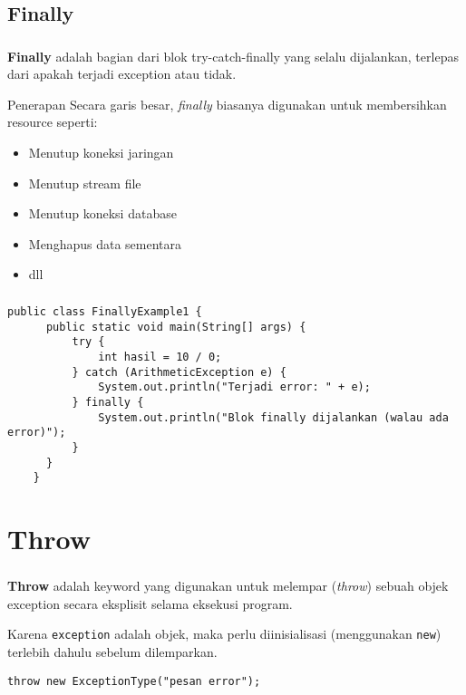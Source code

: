 \documentclass{../praktikum-ppt}
\begin{document}
    \subsection{Finally}
    \begin{frame}
      \frametitle{\insertsection}
      \framesubtitle{\insertsubsection}
      \begin{definisi}
        \textbf{Finally} adalah bagian dari blok try-catch-finally yang selalu dijalankan, terlepas dari apakah terjadi exception atau tidak.        
      \end{definisi}
      \begin{block}{Penerapan}
        Secara garis besar, \textit{finally} biasanya digunakan untuk membersihkan resource seperti:
        \begin{itemize}
          \item Menutup koneksi jaringan
          \item Menutup stream file
          \item Menutup koneksi database
          \item Menghapus data sementara
          \item dll
        \end{itemize}
      \end{block}
    \end{frame}

    \begin{frame}[fragile]
      \frametitle{\insertsection}
      \framesubtitle{\insertsubsection}
      \begin{lstlisting}[caption={\textit{Try-Catch-Finally} pada Java}]
    public class FinallyExample1 {
      public static void main(String[] args) {
          try {
              int hasil = 10 / 0;
          } catch (ArithmeticException e) {
              System.out.println("Terjadi error: " + e);
          } finally {
              System.out.println("Blok finally dijalankan (walau ada error)");
          }
      }
    }
      \end{lstlisting}
    \end{frame}

    \section{Throw}
    \begin{frame}[fragile]
      \frametitle{\insertsection}
      \begin{definisi}
        \textbf{Throw} adalah keyword yang digunakan untuk melempar (\textit{throw}) sebuah objek exception secara eksplisit selama eksekusi program.
      \end{definisi}
      Karena \texttt{exception} adalah objek, maka perlu diinisialisasi (menggunakan \texttt{new}) terlebih dahulu sebelum dilemparkan.
      \begin{lstlisting}[caption={Syntax \textit{Throw}}]
        throw new ExceptionType("pesan error");
      \end{lstlisting}
    \end{frame}
  
\end{document}
